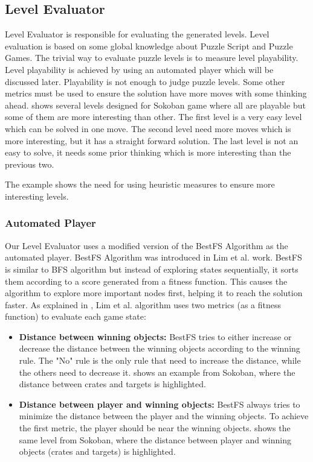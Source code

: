 \subsection{Level Evaluator}
Level Evaluator is responsible for evaluating the generated levels. Level evaluation is based on some global knowledge about Puzzle Script and Puzzle Games. The trivial way to evaluate puzzle levels is to measure level playability. Level playability is achieved by using an automated player which will be discussed later. Playability is not enough to judge puzzle levels. Some other metrics must be used to ensure the solution have more moves with some thinking ahead.  shows several levels designed for Sokoban game where all are playable but some of them are more interesting than other. The first level is a very easy level which can be solved in one move. The second level need more moves which is more interesting, but it has a straight forward solution. The last level is not an easy to solve, it needs some prior thinking which is more interesting than the previous two.


The example shows the need for using heuristic measures to ensure more interesting levels.

\subsubsection{Automated Player}
Our Level Evaluator uses a modified version of the BestFS Algorithm as the automated player. BestFS Algorithm was introduced in Lim et al.\cite{puzzleScriptGeneration} work. BestFS is similar to BFS algorithm but instead of exploring states sequentially, it sorts them according to a score generated from a fitness function. This causes the algorithm to explore more important nodes first, helping it to reach the solution faster. As explained in , Lim et al. algorithm uses two metrics (as a fitness function) to evaluate each game state:
\begin{itemize} \itemsep0pt \parskip0pt 
	\item \textbf{Distance between winning objects:} BestFS tries to either increase or decrease the distance between the winning objects according to the winning rule. The "No" rule is the only rule that need to increase the distance, while the others need to decrease it.  shows an example from Sokoban, where the distance between crates and targets is highlighted.
	\item \textbf{Distance between player and winning objects:} BestFS always tries to minimize the distance between the player and the winning objects. To achieve the first metric, the player should be near the winning objects.  shows the same level from Sokoban, where the distance between player and winning objects (crates and targets) is highlighted.
\end{itemize}

